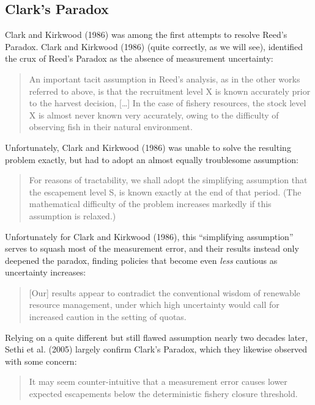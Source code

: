 \documentclass[3p]{elsarticle} %
\begin{document}
\subsection{Clark's Paradox}\label{clarks-paradox}

Clark and Kirkwood (1986) was among the first attempts to resolve Reed's
Paradox. Clark and Kirkwood (1986) (quite correctly, as we will see),
identified the crux of Reed's Paradox as the absence of measurement
uncertainty:

\begin{quote}
An important tacit assumption in Reed's analysis, as in the other works
referred to above, is that the recruitment level X is known accurately
prior to the harvest decision, {[}\ldots{}{]} In the case of fishery
resources, the stock level X is almost never known very accurately,
owing to the difficulty of observing fish in their natural environment.
\end{quote}

Unfortunately, Clark and Kirkwood (1986) was unable to solve the
resulting problem exactly, but had to adopt an almost equally
troublesome assumption:

\begin{quote}
For reasons of tractability, we shall adopt the simplifying assumption
that the escapement level S, is known exactly at the end of that period.
(The mathematical difficulty of the problem increases markedly if this
assumption is relaxed.)
\end{quote}

Unfortunately for Clark and Kirkwood (1986), this ``simplifying
assumption'' serves to squash most of the measurement error, and their
results instead only deepened the paradox, finding policies that become
even \emph{less} cautious as uncertainty increases:

\begin{quote}
{[}Our{]} results appear to contradict the conventional wisdom of
renewable resource management, under which high uncertainty would call
for increased caution in the setting of quotas.
\end{quote}

Relying on a quite different but still flawed assumption nearly two
decades later, Sethi et al. (2005) largely confirm Clark's Paradox,
which they likewise observed with some concern:

\begin{quote}
It may seem counter-intuitive that a measurement error causes lower
expected escapements below the deterministic fishery closure threshold.
\end{quote}
\end{document}
